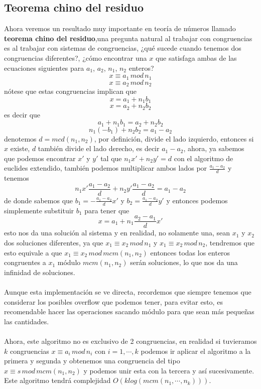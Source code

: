 \subsection*{Teorema chino del residuo}
Ahora veremos un resultado muy importante en teoría de números llamado \textbf{teorema chino del residuo},una pregunta natural al trabajar con congruencias es al trabajar con sistemas de congruencias, ¿qué sucede cuando tenemos dos congruencias diferentes?, ¿cómo encontrar una $x$ que satisfaga ambas de las ecuaciones siguientes para $a_1$, $a_2$, $n_1$, $n_2$ enteros? 
\[x \equiv a_1 \, mod \, n_1\]
\[x \equiv a_2 \, mod \, n_2\]
nótese que estas congruencias implican que 
\[x= a_1 + n_1b_1\]
\[x= a_2 + n_2b_2\]
es decir que
\[a_1+n_1b_1=a_2+n_2b_2\]
\[n_1(-b_1)+n_2b_2=a_1-a_2\]
denotemos $d=mcd(n_1,n_2)$, por definición, divide el lado izquierdo, entonces si $x$ existe, $d$ también divide el lado derecho, es decir $a_1-a_2$, ahora, ya sabemos que podemos encontrar $x'$ y $y'$ tal que $n_1x' + n_2y'=d$ con el algoritmo de euclides extendido, también podemos multiplicar ambos lados por $\frac{a_1-a_2}{d}$ y tenemos
\[n_1x'\frac{a_1-a_2}{d} + n_2y'\frac{a_1-a_2}{d}=a_1-a_2\]
de donde sabemos que $b_1=-\frac{a_1-a_2}{d}x'$ y $b_2=\frac{a_1-a_2}{d}y'$ y entonces podemos simplemente substituir $b_1$ para tener que
\[x=a_1+n_1\frac{a_2-a_1}{d}x'\]
esto nos da una solución al sistema y en realidad, no solamente una, sean $x_1$ y $x_2$ dos soluciones diferentes, ya que $x_1\equiv x_2 \, mod \, n_1$ y $x_1\equiv x_2 \, mod \, n_2$, tendremos que esto equivale a que $x_1 \equiv x_2 \, mod \, mcm(n_1,n_2)$ entonces todas los enteros congruentes a $x_1$ módulo $mcm(n_1,n_2)$ serán soluciones, lo que nos da una infinidad de soluciones. 
\\\\
Aunque esta implementación se ve directa, recordemos que siempre tenemos que considerar los posibles overflow que podemos tener, para evitar esto, es recomendable hacer las operaciones sacando módulo para que sean más pequeñas las cantidades.
\\\\
Ahora, este algoritmo no es exclusivo de 2 congruencias, en realidad si tuvieramos $k$ congruencias $x \equiv a_i \, mod \, n_i$ con $i=1,\cdots,k$  podemos ir aplicar el algoritmo a la primera y segunda y obtenemos una congruencia del tipo $x \equiv s \, mod \, mcm(n_1,n_2)$ y podemos unir esta con la tercera y así sucesivamente. Este algoritmo tendrá complejidad $O(klog(mcm(n_1,\cdots,n_k)))$.
\\\\

